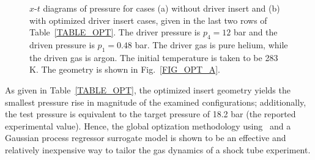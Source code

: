 \begin{figure}[!ht!]
	\centering
	\caption{\label{FIG_XTOPT}$x$-$t$ diagrams of pressure for cases (a) without driver insert and (b) with optimized driver insert cases, given in the last two rows of Table~\ref{TABLE_OPT}. The driver pressure is $p_4=12$ bar and the driven pressure is $p_1=0.48$ bar. The driver gas is pure helium, while the driven gas is argon. The initial temperature is taken to be 283 K. The geometry is shown in Fig.~\ref{FIG_OPT_A}.}
\end{figure}

As given in Table~\ref{TABLE_OPT}, the optimized insert geometry yields the smallest pressure rise in magnitude of the examined configurations; additionally, the test pressure is equivalent to the target pressure of 18.2 bar (the reported experimental value). Hence, the global optization methodology using \stnshk\ and a Gaussian process regressor surrogate model is shown to be an effective and relatively inexpensive way to tailor the gas dynamics of a shock tube experiment.

